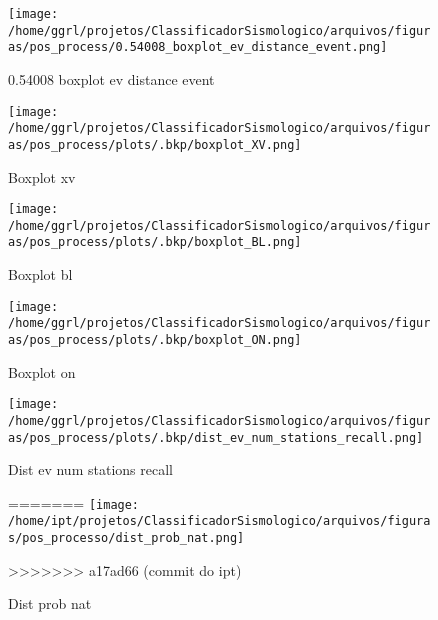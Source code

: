                     \begin{figure}[H]
                        \centering
                        \texttt{[image: /home/ggrl/projetos/ClassificadorSismologico/arquivos/figuras/pos\_process/0.54008\_boxplot\_ev\_distance\_event.png]}
                        \caption{0.54008 boxplot ev distance event}
                        \label{fig:0.54008_boxplot_ev_distance_event}
                    \end{figure}
                

                    \begin{figure}[H]
                        \centering
                        \texttt{[image: /home/ggrl/projetos/ClassificadorSismologico/arquivos/figuras/pos\_process/plots/.bkp/boxplot\_XV.png]}
                        \caption{Boxplot xv}
                        \label{fig:boxplot_XV}
                    \end{figure}
                

                    \begin{figure}[H]
                        \centering
                        \texttt{[image: /home/ggrl/projetos/ClassificadorSismologico/arquivos/figuras/pos\_process/plots/.bkp/boxplot\_BL.png]}
                        \caption{Boxplot bl}
                        \label{fig:boxplot_BL}
                    \end{figure}
                

                    \begin{figure}[H]
                        \centering
                        \texttt{[image: /home/ggrl/projetos/ClassificadorSismologico/arquivos/figuras/pos\_process/plots/.bkp/boxplot\_ON.png]}
                        \caption{Boxplot on}
                        \label{fig:boxplot_ON}
                    \end{figure}
                

                    \begin{figure}[H]
                        \centering
                        \texttt{[image: /home/ggrl/projetos/ClassificadorSismologico/arquivos/figuras/pos\_process/plots/.bkp/dist\_ev\_num\_stations\_recall.png]}
                        \caption{Dist ev num stations recall}
                        \label{fig:dist_ev_num_stations_recall}
=======
                        \texttt{[image: /home/ipt/projetos/ClassificadorSismologico/arquivos/figuras/pos\_processo/dist\_prob\_nat.png]}
                        \caption{Dist prob nat}
                        \label{fig:dist_prob_nat}
>>>>>>> a17ad66 (commit do ipt)
                    \end{figure}
                

